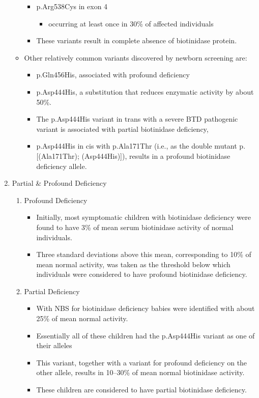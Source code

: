 \documentclass{scrartcl}
\begin{document}
\begin{enumerate}
\begin{itemize}
\begin{itemize}
\item p.Arg538Cys in exon 4
\begin{itemize}
\item occurring at least once in 30\% of affected individuals
\end{itemize}

\item These variants result in complete absence of biotinidase protein.
\end{itemize}

\item Other relatively common variants discovered by newborn screening are:
\begin{itemize}
\item p.Gln456His, associated with profound deficiency

\item p.Asp444His, a substitution that reduces enzymatic activity by about 50\%.

\item The p.Asp444His variant in trans with a severe BTD pathogenic variant is associated with partial biotinidase deficiency,
\item p.Asp444His in cis with p.Ala171Thr (i.e., as the double mutant p.[(Ala171Thr); (Asp444His)]), results in a profound biotinidase deficiency allele.
\end{itemize}
\end{itemize}


\item Partial \& Profound Deficiency
\label{sec:orgd41ccb3}

\begin{enumerate}
\item Profound Deficiency
\label{sec:org4b292a0}
\begin{itemize}
\item Initially, most symptomatic children with biotinidase deficiency were found to have 3\% of mean serum biotinidase activity of normal individuals.
\item Three standard deviations above this mean, corresponding to 10\% of mean normal activity, was taken as the threshold below which individuals were considered to have profound biotinidase deficiency.
\end{itemize}

\item Partial Deficiency
\label{sec:org5e7a92b}
\begin{itemize}
\item With NBS for biotinidase deficiency babies were identified with about 25\% of mean normal activity.
\item Essentially all of these children had the p.Asp444His variant as one of their alleles
\item This variant, together with a variant for profound deficiency on the other allele, results in 10–30\% of mean normal biotinidase activity.
\item These children are considered to have partial biotinidase deficiency.
\end{itemize}
\end{enumerate}



\end{enumerate}
\end{document}
